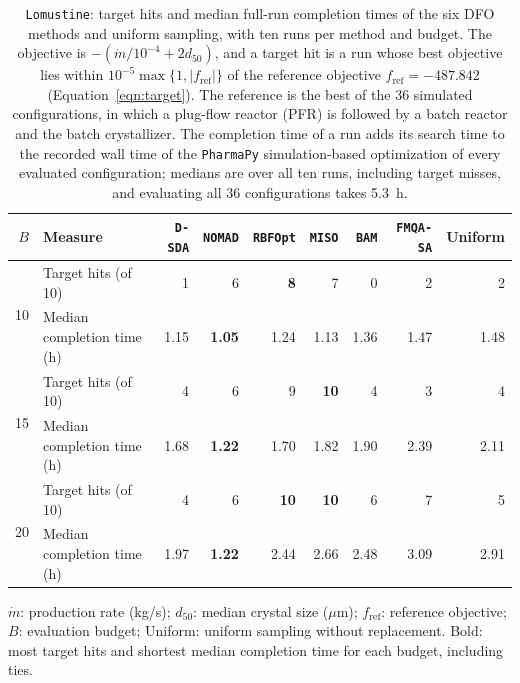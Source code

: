 \documentclass{article}
\begin{document}
\begin{table}[htbp]
\centering
\caption{\texttt{Lomustine}: target hits and median full-run completion times of the six DFO methods and uniform sampling, with ten runs per method and budget.
The objective is \(-(\dot m/10^{-4}+2d_{50})\), and a target hit is a run whose best objective lies within \(10^{-5}\max\{1,|f_{\mathrm{ref}}|\}\) of the reference objective \(f_{\mathrm{ref}}=-487.842\) (Equation~\eqref{eqn:target}).
The reference is the best of the 36 simulated configurations, in which a plug-flow reactor (PFR) is followed by a batch reactor and the batch crystallizer.
The completion time of a run adds its search time to the recorded wall time of the \texttt{PharmaPy} simulation-based optimization of every evaluated configuration; medians are over all ten runs, including target misses, and evaluating all 36 configurations takes 5.3~h.}
\label{tab:lomustine}
\footnotesize
\setlength{\tabcolsep}{3.5pt}
\begin{threeparttable}
\begin{tabular}{@{}rlrrrrrrr@{}}\toprule
\(B\) & Measure & \texttt{D-SDA} & \texttt{NOMAD} & \texttt{RBFOpt} & \texttt{MISO} & \texttt{BAM} & \texttt{FMQA-SA} & Uniform\\\midrule
\multirow{2}{*}{10} & Target hits (of 10) & 1 & 6 & \textbf{8} & 7 & 0 & 2 & 2 \\
 & Median completion time (h) & 1.15 & \textbf{1.05} & 1.24 & 1.13 & 1.36 & 1.47 & 1.48 \\
\midrule
\multirow{2}{*}{15} & Target hits (of 10) & 4 & 6 & 9 & \textbf{10} & 4 & 3 & 4 \\
 & Median completion time (h) & 1.68 & \textbf{1.22} & 1.70 & 1.82 & 1.90 & 2.39 & 2.11 \\
\midrule
\multirow{2}{*}{20} & Target hits (of 10) & 4 & 6 & \textbf{10} & \textbf{10} & 6 & 7 & 5 \\
 & Median completion time (h) & 1.97 & \textbf{1.22} & 2.44 & 2.66 & 2.48 & 3.09 & 2.91 \\
\bottomrule
\end{tabular}
\begin{tablenotes}[flushleft]\footnotesize
\item \(\dot m\): production rate (kg/s); \(d_{50}\): median crystal size (\(\mu\)m); \(f_{\mathrm{ref}}\): reference objective; \(B\): evaluation budget; Uniform: uniform sampling without replacement.
Bold: most target hits and shortest median completion time for each budget, including ties.
\end{tablenotes}
\end{threeparttable}
\end{table}
\FloatBarrier
\end{document}
